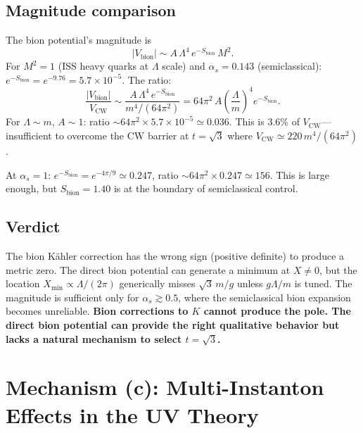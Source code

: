 \subsection{Magnitude comparison}

The bion potential's magnitude is
\begin{equation}
|V_{\text{bion}}| \sim A\,\Lambda^4\,e^{-S_{\text{bion}}}\,M^2.
\end{equation}
For $M^2 = 1$ (ISS heavy quarks at $\Lambda$ scale) and $\alpha_s = 0.143$ (semiclassical):
$e^{-S_{\text{bion}}} = e^{-9.76} = 5.7 \times 10^{-5}$.
The ratio:
\begin{equation}
\frac{|V_{\text{bion}}|}{V_{\text{CW}}} \sim \frac{A\,\Lambda^4\,e^{-S_{\text{bion}}}}
{m^4/(64\pi^2)} = 64\pi^2\,A\left(\frac{\Lambda}{m}\right)^4 e^{-S_{\text{bion}}}.
\end{equation}
For $\Lambda \sim m$, $A \sim 1$: ratio $\sim 64\pi^2 \times 5.7 \times 10^{-5} \simeq 0.036$.
This is 3.6\% of $V_{\text{CW}}$---insufficient to overcome the CW barrier at $t = \sqrt{3}$
where $V_{\text{CW}} \simeq 220\,m^4/(64\pi^2)$.

At $\alpha_s = 1$: $e^{-S_{\text{bion}}} = e^{-4\pi/9} \simeq 0.247$,
ratio $\sim 64\pi^2 \times 0.247 \simeq 156$. This is large enough,
but $S_{\text{bion}} = 1.40$ is at the boundary of semiclassical control.

\subsection{Verdict}

The bion K\"ahler correction has the wrong sign (positive definite) to produce
a metric zero. The direct bion potential can generate a minimum at
$X \neq 0$, but the location $X_{\min} \propto \Lambda/(2\pi)$ generically misses
$\sqrt{3}\,m/g$ unless $g\Lambda/m$ is tuned. The magnitude is sufficient only
for $\alpha_s \gtrsim 0.5$, where the semiclassical bion expansion becomes unreliable.
\textbf{Bion corrections to $K$ cannot produce the pole. The direct bion potential
can provide the right qualitative behavior but lacks a natural mechanism to
select $t = \sqrt{3}$.}


\section{Mechanism (c): Multi-Instanton Effects in the UV Theory}

